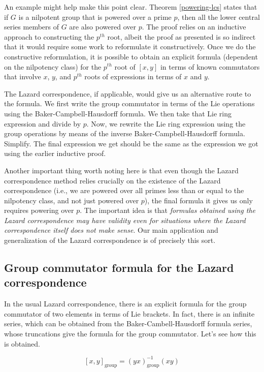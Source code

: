 An example might help make this point clear. Theorem
\ref{powering-lcs} states that if $G$ is a nilpotent group that is
powered over a prime $p$, then all the lower central series members of
$G$ are also powered over $p$. The proof relies on an inductive
approach to constructing the $p^{th}$ root, albeit the proof as
presented is so indirect that it would require some work to
reformulate it constructively. Once we do the constructive
reformulation, it is possible to obtain an explicit formula (dependent
on the nilpotency class) for the $p^{th}$ root of $[x,y]$ in terms of
known commutators that involve $x$, $y$, and $p^{th}$ roots of
expressions in terms of $x$ and $y$.

The Lazard correspondence, if applicable, would give us an alternative
route to the formula. We first write the group commutator in terms of
the Lie operations using the Baker-Campbell-Hausdorff formula. We then
take that Lie ring expression and divide by $p$. Now, we rewrite the
Lie ring expression using the group operations by means of the inverse
Baker-Campbell-Hausdorff formula. Simplify. The final expression we
get should be the same as the expression we got using the earlier
inductive proof.

Another important thing worth noting here is that even though the
Lazard correspondence method relies crucially on the existence of the
Lazard correspondence (i.e., we are powered over all primes less than
or equal to the nilpotency class, and not just powered over $p$), the
final formula it gives us only requires powering over $p$. The
important idea is that {\em formulas obtained using the Lazard
  correspondence may have validity even for situations where the
  Lazard correspondence itself does not make sense}. Our main
application and generalization of the Lazard correspondence is of
precisely this sort.

\subsection{Group commutator formula for the Lazard correspondence}

In the usual Lazard correspondence, there is an explicit formula for
the group commutator of two elements in terms of Lie brackets. In
fact, there is an infinite series, which can be obtained from the
Baker-Cambell-Hausdorff formula series, whose truncations give the
formula for the group commutator. Let's see how this is obtained.

$$[x,y]_{\text{group}} = (yx)_{\text{group}}^{-1}(xy)$$

